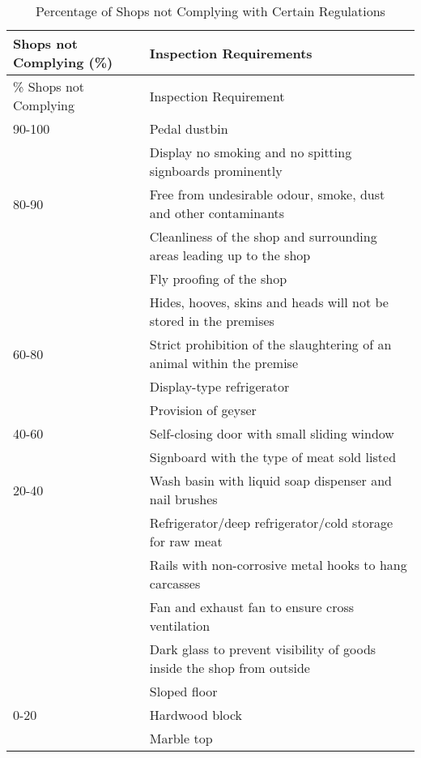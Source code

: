 \documentclass[a4paper, 12pt]{article}
\newcommand\tabitem{\makebox[1em][r]{\textbullet~}}
\begin{document}
\begin{longtable}{>{\raggedright}p{2.8cm}>{\raggedright\arraybackslash}p{13cm}}
\caption{Percentage of Shops not Complying with Certain Regulations} \\ 
Shops not Complying (\%) & Inspection Requirements \\
\toprule
\endfirsthead
\% Shops not Complying & Inspection Requirement \\
\toprule
\endhead
\endfoot
\hline
\endlastfoot

90-100 & \tabitem Pedal dustbin \\
 & \tabitem Display no smoking and no spitting signboards prominently \\
 \midrule
80-90 & \tabitem Free from undesirable odour, smoke, dust and other contaminants \\
 &  \tabitem Cleanliness of the shop and surrounding areas leading up to the shop \\
 & \tabitem Fly proofing of the shop \\
 & \tabitem Hides, hooves, skins and heads will not be stored in the premises \\
\midrule
60-80 & \tabitem Strict prohibition of the slaughtering of an animal within the premise \\
 & \tabitem Display-type refrigerator \\
 & \tabitem Provision of geyser \\
\midrule
40-60 & \tabitem Self-closing door with small sliding window \\
 & \tabitem Signboard with the type of meat sold listed \\
\midrule
20-40 & \tabitem Wash basin with liquid soap dispenser and nail brushes \\
 & \tabitem Refrigerator/deep refrigerator/cold storage for raw meat \\
 & \tabitem Rails with non-corrosive metal hooks to hang carcasses \\
 & \tabitem Fan and exhaust fan to ensure cross ventilation \\
 & \tabitem Dark glass to prevent visibility of goods inside the shop from outside \\
 & \tabitem Sloped floor \\
\midrule
0-20 & \tabitem Hardwood block \\
 & \tabitem Marble top \\

\end{longtable}
\end{document}
